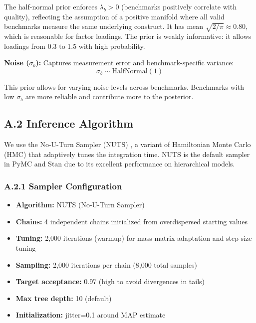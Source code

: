 The half-normal prior enforces $\lambda_b > 0$ (benchmarks positively correlate with quality), reflecting the assumption of a positive manifold where all valid benchmarks measure the same underlying construct. It has mean $\sqrt{2/\pi} \approx 0.80$, which is reasonable for factor loadings. The prior is weakly informative: it allows loadings from 0.3 to 1.5 with high probability.

\textbf{Noise ($\sigma_b$):} Captures measurement error and benchmark-specific variance:
\begin{equation}
\sigma_b \sim \text{HalfNormal}(1)
\end{equation}

This prior allows for varying noise levels across benchmarks. Benchmarks with low $\sigma_b$ are more reliable and contribute more to the posterior.

\subsection*{A.2 Inference Algorithm}

We use the No-U-Turn Sampler (NUTS) \cite{hoffman2014nuts}, a variant of Hamiltonian Monte Carlo (HMC) that adaptively tunes the integration time. NUTS is the default sampler in PyMC and Stan due to its excellent performance on hierarchical models.

\subsubsection*{A.2.1 Sampler Configuration}

\begin{itemize}
    \item \textbf{Algorithm:} NUTS (No-U-Turn Sampler)
    \item \textbf{Chains:} 4 independent chains initialized from overdispersed starting values
    \item \textbf{Tuning:} 2,000 iterations (warmup) for mass matrix adaptation and step size tuning
    \item \textbf{Sampling:} 2,000 iterations per chain (8,000 total samples)
    \item \textbf{Target acceptance:} 0.97 (high to avoid divergences in tails)
    \item \textbf{Max tree depth:} 10 (default)
    \item \textbf{Initialization:} jitter=0.1 around MAP estimate
\end{itemize}

